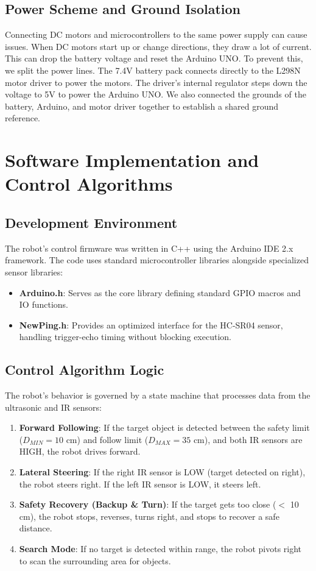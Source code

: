 \documentclass[12pt,a4paper,oneside]{report}
\begin{document}
\section{Power Scheme and Ground Isolation}
Connecting DC motors and microcontrollers to the same power supply can cause issues. When DC motors start up or change directions, they draw a lot of current. This can drop the battery voltage and reset the Arduino UNO. To prevent this, we split the power lines. The 7.4V battery pack connects directly to the L298N motor driver to power the motors. The driver's internal regulator steps down the voltage to 5V to power the Arduino UNO. We also connected the grounds of the battery, Arduino, and motor driver together to establish a shared ground reference.
\clearpage

\chapter{Software Implementation and Control Algorithms}
\section{Development Environment}
The robot's control firmware was written in C++ using the Arduino IDE 2.x framework. The code uses standard microcontroller libraries alongside specialized sensor libraries:
\begin{itemize}[noitemsep,topsep=2pt,parsep=0pt,partopsep=0pt]
    \item \textbf{Arduino.h}: Serves as the core library defining standard GPIO macros and IO functions.
    \item \textbf{NewPing.h}: Provides an optimized interface for the HC-SR04 sensor, handling trigger-echo timing without blocking execution.
\end{itemize}

\section{Control Algorithm Logic}
The robot's behavior is governed by a state machine that processes data from the ultrasonic and IR sensors:
\begin{enumerate}[noitemsep,topsep=2pt,parsep=0pt,partopsep=0pt]
    \item \textbf{Forward Following}: If the target object is detected between the safety limit ($D_{MIN} = 10$ cm) and follow limit ($D_{MAX} = 35$ cm), and both IR sensors are HIGH, the robot drives forward.
    \item \textbf{Lateral Steering}: If the right IR sensor is LOW (target detected on right), the robot steers right. If the left IR sensor is LOW, it steers left.
    \item \textbf{Safety Recovery (Backup \& Turn)}: If the target gets too close ($<$ 10 cm), the robot stops, reverses, turns right, and stops to recover a safe distance.
    \item \textbf{Search Mode}: If no target is detected within range, the robot pivots right to scan the surrounding area for objects.
\end{enumerate}
\end{document}
